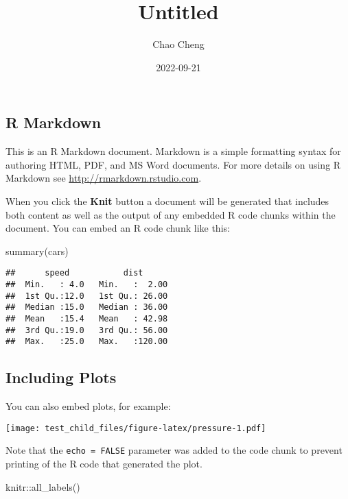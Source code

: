 \documentclass[
]{ctexart}
\title{Untitled}
\author{Chao Cheng}
\date{2022-09-21}
\newenvironment{Shaded}{\begin{snugshade}}{\end{snugshade}}
\newcommand{\FunctionTok}[1]{\textcolor[rgb]{0.00,0.00,0.00}{#1}}
\newcommand{\NormalTok}[1]{#1}
\newcommand{\SpecialCharTok}[1]{\textcolor[rgb]{0.00,0.00,0.00}{#1}}
\begin{document}
\maketitle

{
\setcounter{tocdepth}{2}
\tableofcontents
}
\hypertarget{r-markdown}{%
\subsection{R Markdown}\label{r-markdown}}

This is an R Markdown document. Markdown is a simple formatting syntax
for authoring HTML, PDF, and MS Word documents. For more details on
using R Markdown see \url{http://rmarkdown.rstudio.com}.

When you click the \textbf{Knit} button a document will be generated
that includes both content as well as the output of any embedded R code
chunks within the document. You can embed an R code chunk like this:

\begin{Shaded}
\begin{Highlighting}[]
\FunctionTok{summary}\NormalTok{(cars)}
\end{Highlighting}
\end{Shaded}

\begin{verbatim}
##      speed           dist       
##  Min.   : 4.0   Min.   :  2.00  
##  1st Qu.:12.0   1st Qu.: 26.00  
##  Median :15.0   Median : 36.00  
##  Mean   :15.4   Mean   : 42.98  
##  3rd Qu.:19.0   3rd Qu.: 56.00  
##  Max.   :25.0   Max.   :120.00
\end{verbatim}

\hypertarget{including-plots}{%
\subsection{Including Plots}\label{including-plots}}

You can also embed plots, for example:

\texttt{[image: test\_child\_files/figure-latex/pressure-1.pdf]}

Note that the \texttt{echo\ =\ FALSE} parameter was added to the code
chunk to prevent printing of the R code that generated the plot.

\begin{Shaded}
\begin{Highlighting}[]
\NormalTok{knitr}\SpecialCharTok{::}\FunctionTok{all\_labels}\NormalTok{()}
\end{Highlighting}
\end{Shaded}
\end{document}
